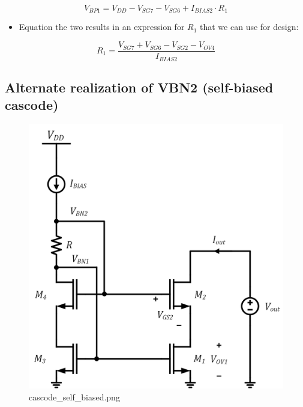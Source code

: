 \documentclass[11pt]{article}
\providecommand{\tightlist}{%
      \setlength{\itemsep}{0pt}\setlength{\parskip}{0pt}}
\begin{document}
\begin{equation}
V_{BP1} = V_{DD} - V_{SG7} - V_{SG6} + I_{BIAS2}\cdot R_1
\end{equation}

\begin{itemize}
\tightlist
\item
  Equation the two results in an expression for \(R_1\) that we can use
  for design:
\end{itemize}

\begin{equation}
R_1 = \dfrac{V_{SG7}+V_{SG6}-V_{SG2}-V_{OV4}}{I_{BIAS2}}
\end{equation}

    \hypertarget{alternate-realization-of-vbn2-self-biased-cascode}{%
\subsection{Alternate realization of VBN2 (self-biased
cascode)}\label{alternate-realization-of-vbn2-self-biased-cascode}}

    \begin{figure}
\centering
\includegraphics{cascode_self_biased.png}
\caption{cascode\_self\_biased.png}
\end{figure}
\end{document}
